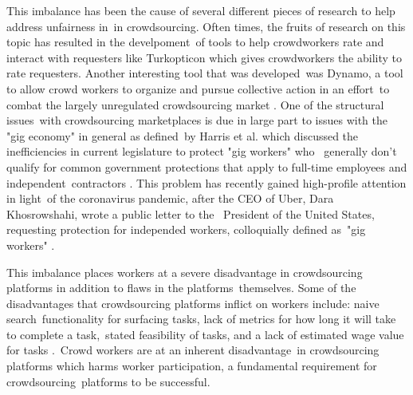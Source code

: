 \documentclass[letterpaper,12pt]{article}
\begin{document}
This imbalance has been the cause of several different pieces of research to help address unfairness in\
in crowdsourcing. Often times, the fruits of research on this topic has resulted in the develpoment\
of tools to help crowdworkers rate and interact with requesters like Turkopticon \cite{irani2013turkopticon}
which gives crowdworkers the ability to rate requesters. Another interesting tool that was developed\
was Dynamo, a tool to allow crowd workers to organize and pursue collective action in an effort\
to combat the largely unregulated crowdsourcing market \cite{salehi2015we}. One of the structural issues\
with crowdsourcing marketplaces is due in large part to issues with the "gig economy" in general as defined\
by Harris et al. which discussed the inefficiencies in current legislature to protect "gig workers" who \
generally don't qualify for common government protections that apply to full-time employees and independent\
contractors \cite{harris2015proposal}. This problem has recently gained high-profile attention in light\
of the coronavirus pandemic, after the CEO of Uber, Dara Khosrowshahi, wrote a public letter to the \
President of the United States, requesting protection for independed workers, colloquially defined as\
"gig workers" \cite{kohsrowshahi_2020}.

This imbalance places workers at a severe disadvantage in crowdsourcing platforms in addition to flaws in the platforms\
themselves. Some of the disadvantages that crowdsourcing platforms inflict on workers include: naive search\
functionality for surfacing tasks, lack of metrics for how long it will take to complete a task,\
stated feasibility of tasks, and a lack of estimated wage value for tasks \cite{Kaplan2018}.\
Crowd workers are at an inherent disadvantage\
in crowdsourcing platforms which harms worker participation, a fundamental requirement for crowdsourcing\
platforms to be successful.
\end{document}
